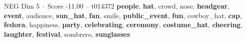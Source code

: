 \begin{textsample}{NEG Dim 5 – Score -11.00 – t014372}  \label{ex:f5_neg_001}
\textbf{people}, \textbf{hat}, crowd, nose, \textbf{headgear}, \textbf{event}, audience, \textbf{sun\_hat}, \textbf{fan}, smile, \textbf{public\_event}, \textbf{fun}, cowboy\_hat, \textbf{cap}, \textbf{fedora}, happiness, \textbf{party}, \textbf{celebrating}, \textbf{ceremony}, \textbf{costume\_hat}, \textbf{cheering}, \textbf{laughter}, \textbf{festival}, sombrero, \textbf{sunglasses}

\end{textsample}

